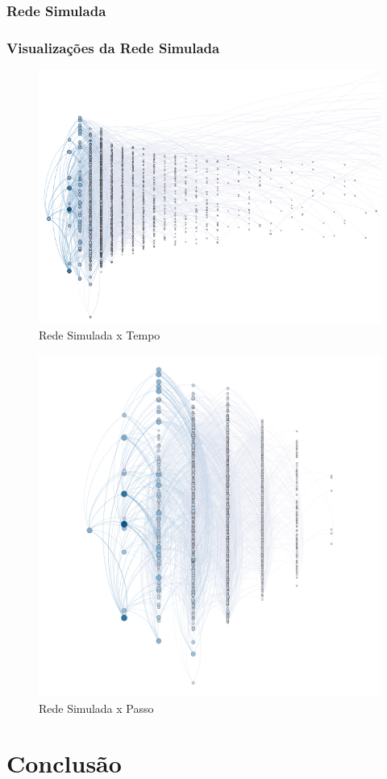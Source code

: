\documentclass[a4paper,12pt]{article}
\begin{document}
\subsubsection{Rede Simulada}

\subsubsection{Visualizações da Rede Simulada}

\begin{figure}[ht]
 \centering
 \includegraphics[scale=0.8]{../results/simul.png}
 \caption{Rede Simulada x Tempo}
\end{figure}

\begin{figure}[h]
 \centering
 \includegraphics[scale=0.4]{../results/Untitled.png}
 \caption{Rede Simulada x Passo}
\end{figure}




\pagebreak
\section{Conclusão}



\pagebreak


\end{document}
